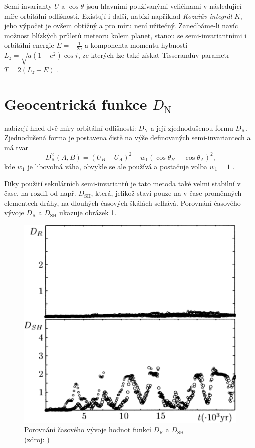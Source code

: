 \medskip

Semi-invarianty $U$ a $\cos{\theta}$ jsou hlavními používanými veličinami v následující míře orbitální odlišnosti. Existují i další, \cite{newapproach} nabízí například \textit{Kozaiův integrál} $K$, jeho výpočet je ovšem obtížný a pro míru není užitečný. Zanedbáme-li navíc možnost blízkých průletů meteoru kolem planet, stanou se semi-invariantními i orbitální energie $E=-\frac{1}{2a}$ a komponenta momentu hybnosti $L_z=\sqrt{a(1-e^2)\cos{i}}$, ze kterých lze také získat Tisserandův parametr $T=2(L_z-E)$ \cite{newapproach}.

\section{Geocentrická funkce $D_\text{N}$}%
\citeauthor{newapproach} nabízejí hned dvě míry orbitální odlišnosti: $D_\text{N}$ a její zjednodušenou formu $D_\text{R}$. Zjednodušená forma je postavena čistě na výše definovaných semi-invariantech a má tvar \cite{newapproach}
\begin{equation}
    D_\text{R}^2(A,B)=\left( U_B-U_A \right)^2+w_1\left( \cos{\theta_B} - \cos{\theta_A} \right)^2\text{,}
\end{equation}
kde $w_1$ je libovolná váha, obvykle se ale používá a postačuje volba $w_1=1$ \cite{newapproach}\cite{galligan}.

Díky použití sekulárních semi-invariantů je tato metoda také velmi stabilní v čase, na rozdíl od např. $D_\text{SH}$, která, jelikož staví pouze na v čase proměnných elementech dráhy, na dlouhých časových škálách selhává. Porovnání časového vývoje $D_\text{R}$ a $D_\text{SH}$ ukazuje obrázek \ref{img:new:time}.

\begin{figure}[ht]
    \centering
    \includegraphics[width=0.5\linewidth]{img/newapproach-time-evolution.png}
    \caption[Porovnání časového vývoje hodnot funkcí $D_\text{R}$ a $D_\text{SH}$]{
        Porovnání časového vývoje hodnot funkcí $D_\text{R}$ a $D_\text{SH}$\\
        {\small (zdroj: \cite{newapproach})}
    }
    \label{img:new:time}
\end{figure}


